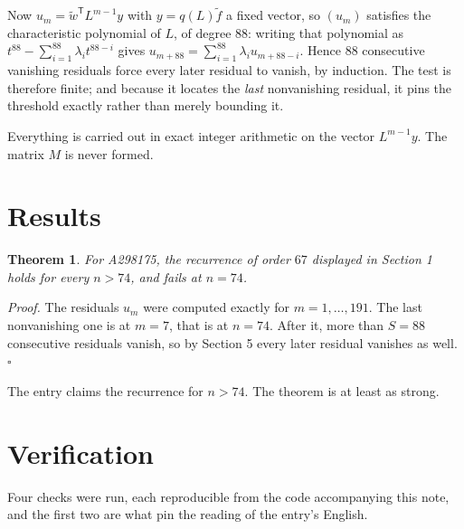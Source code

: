 \documentclass[11pt]{article}
\newtheorem{theorem}{Theorem}
\theoremstyle{definition}
\begin{document}
Now $u_m = \tilde w^{\mathsf T} L^{m-1} y$ with $y = q(L)\tilde f$ a fixed vector, so $(u_m)$ satisfies the characteristic polynomial of $L$, of degree $88$: writing that polynomial as $t^{88} - \sum_{i=1}^{88} \lambda_i t^{88-i}$ gives $u_{m+88} = \sum_{i=1}^{88} \lambda_i u_{m+88-i}$. Hence $88$ consecutive vanishing residuals force every later residual to vanish, by induction. The test is therefore finite; and because it locates the {\itshape last} nonvanishing residual, it pins the threshold exactly rather than merely bounding it.

Everything is carried out in exact integer arithmetic on the vector $L^{m-1}y$. The matrix $M$ is never formed.

\section{Results}

\begin{theorem} For A298175, the recurrence of order $67$ displayed in Section 1 holds for every $n > 74$, and fails at $n = 74$.\end{theorem}

{\itshape Proof.} The residuals $u_m$ were computed exactly for $m = 1,\dots,191$. The last nonvanishing one is at $m = 7$, that is at $n = 74$. After it, more than $S = 88$ consecutive residuals vanish, so by Section 5 every later residual vanishes as well. $\square$

The entry claims the recurrence for $n > 74$. The theorem is at least as strong.

\section{Verification}

Four checks were run, each reproducible from the code accompanying this note, and the first two are what pin the reading of the entry's English.
\end{document}

